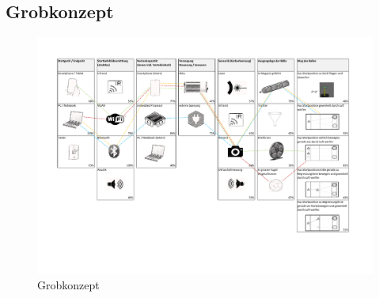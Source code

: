 \begin{landscape}
	\section{Grobkonzept}
		\begin{figure}[h!]
			\includegraphics[page=1,scale=0.75,clip,trim=17mm 37mm 21mm 19mm]{Morphologie/Bilder/Grobkonzept.pdf}
			\centering
			\caption{Grobkonzept} 
			\label{abb:Grobkonzept}
		\end{figure}	
\end{landscape} 

